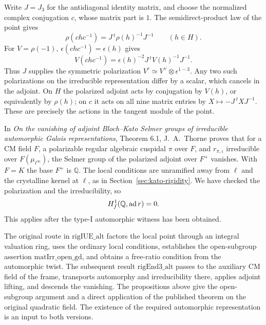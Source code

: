 Write \(J=J_3\) for the antidiagonal identity matrix, and choose
the normalized complex conjugation \(c\), whose matrix part is \(1\).
The semidirect-product law of the point gives
\[
 \rho(chc^{-1})=J\,{}^t\!\rho(h)^{-1}J^{-1}\qquad(h\in H).
\]
For \(V=\rho(-1)\), \(\epsilon(chc^{-1})=\epsilon(h)\) gives
\[
 V(chc^{-1})=\epsilon(h)^{-2}J\,{}^t\!V(h)^{-1}J^{-1}.
\]
Thus \(J\) supplies the symmetric polarization
\(V^c\simeq V^\vee\otimes\epsilon^{1-3}\).
Any two such polarizations on the irreducible representation
differ by a scalar, which cancels in the adjoint. On \(H\) the
polarized adjoint acts by conjugation by \(V(h)\), or equivalently
by \(\rho(h)\); on \(c\) it acts on all nine matrix entries by
\(X\mapsto-J\,{}^t\!XJ^{-1}\). These are precisely the actions
in the tangent module of the point.

In \emph{On the vanishing of adjoint Bloch--Kato Selmer groups of
irreducible automorphic Galois representations}, Theorem 6.1,
J.\ A.\ Thorne proves that for a CM field \(F\), a polarizable
regular algebraic cuspidal \(\pi\) over \(F\), and
\(r_{\pi,\iota}\) irreducible over \(F(\mu_{\ell^\infty})\), the
Selmer group of the polarized adjoint over \(F^+\) vanishes.
With \(F=K\) the base \(F^+\) is \(\mathbb Q\). The local
conditions are unramified away from \(\ell\) and the crystalline
kernel at \(\ell\), as in Section~\ref{sec:kato-rigidity}.
We have checked the polarization and the irreducibility, so
\[
 H^1_f(\mathbb Q,{\rm ad}\,r)=0.
\]
This applies after the type-I automorphic witness has been obtained.

The original route in \(\mathrm{rigIUE\_alt}\) factors the local
point through an integral valuation ring, uses the ordinary local
conditions, establishes the open-subgroup assertion
\(\mathrm{matIrr\_open\_gd}\), and obtains a free-ratio condition
from the automorphic twist. The subsequent result
\(\mathrm{rigEnd3\_alt}\) passes to the auxiliary CM field of the
frame, transports automorphy and irreducibility there, applies
adjoint lifting, and descends the vanishing. The propositions above
give the open-subgroup argument and a direct application of the
published theorem on the original quadratic field. The existence of
the required automorphic representation is an input to both versions.
